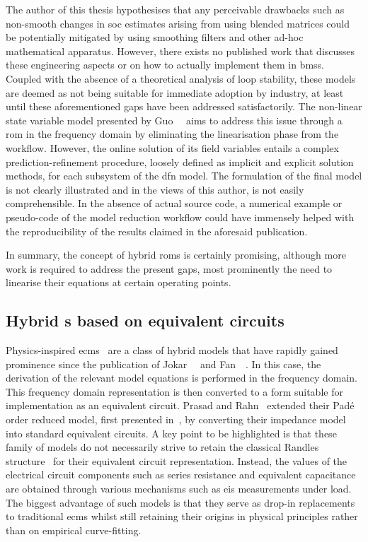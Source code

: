 The author  of this thesis hypothesises  that any perceivable drawbacks  such as
non-smooth changes  in \gls{soc} estimates  arising from using  blended matrices
could  be potentially  mitigated by  using  smoothing filters  and other  ad-hoc
mathematical apparatus. However,  there exists no published  work that discusses
these engineering aspects  or on how to actually implement  them in \glspl{bms}.
Coupled with  the absence  of a  theoretical analysis  of loop  stability, these
models are deemed  as not being suitable for immediate  adoption by industry, at
least until  these aforementioned gaps  have been addressed  satisfactorily. The
non-linear state variable model  presented by Guo~\etal{}~\cite{Guo2017} aims to
address this  issue through a \gls{rom}  in the frequency domain  by eliminating
the linearisation phase  from the workflow. However, the online  solution of its
field  variables  entails  a complex  prediction-refinement  procedure,  loosely
defined as  implicit and explicit  solution methods,  for each subsystem  of the
\gls{dfn} model. The  formulation of the final model is  not clearly illustrated
and in the views of this author, is not easily comprehensible. In the absence of
actual source  code, a numerical example  or pseudo-code of the  model reduction
workflow could  have immensely  helped with the  reproducibility of  the results
claimed in the aforesaid publication.

In summary, the  concept of hybrid \glspl{rom} is  certainly promising, although
more work is required to address the  present gaps, most prominently the need to
linearise their equations at certain operating points.


\subsection{Hybrid s based on equivalent circuits}

Physics-inspired
\glspl{ecm}~\cite{Prasad2012,Prasad2014,Zhang2017,Cheng2017,Merla2018}
are a class of hybrid models that have rapidly gained prominence since the
publication of Jokar~\etal~\cite{Jokar2016} and Fan~\etal~\cite{Fan2015}. In
this case, the derivation of the relevant model equations is performed in
the frequency domain. This frequency domain representation is then converted
to a form suitable for implementation as an equivalent circuit. Prasad
and Rahn~\cite{Prasad2014} extended their Padé order reduced model, first
presented in~\cite{Prasad2013}, by converting their impedance model into
standard equivalent circuits. A key point to be highlighted is that these
family of models do not necessarily strive to retain the classical Randles
structure~\cite{Randles1947} for their equivalent circuit representation.
Instead, the values of the electrical circuit components such as series
resistance and equivalent capacitance are obtained through various mechanisms
such as \gls{eis} measurements under load. The biggest advantage of such
models is that they serve as drop-in replacements to traditional \glspl{ecm}
whilst still retaining their origins in physical principles rather than on
empirical curve-fitting.


